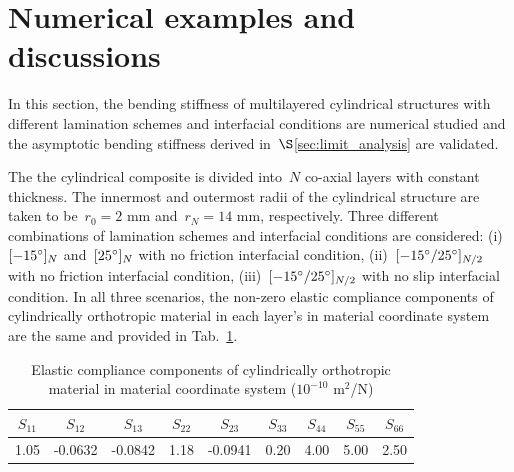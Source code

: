 \documentclass[preprint,10pt,times]{elsarticle}
\numberwithin{equation}{section}
\renewcommand{\>}{$\Rightarrow$}
\begin{document}
\section{Numerical examples and discussions}
\label{sec:discussion}
In this section, the bending stiffness of multilayered cylindrical structures with different lamination schemes and interfacial conditions are numerical studied and the asymptotic bending stiffness derived in~$\S$\ref{sec:limit_analysis} are validated.

The the cylindrical composite is divided into~$N$ co-axial layers with constant thickness.
The innermost and outermost radii of the cylindrical structure are taken to be~$r_0 = 2$ mm and~$r_N = 14$ mm, respectively.
Three different combinations of lamination schemes and interfacial conditions are considered: (i)~$[-15 \degree]_N$ and~$[25 \degree]_N$ with no friction interfacial condition, (ii)~$[-15 \degree/ 25 \degree]_{N/2}$ with no friction interfacial condition, (iii)~$[-15 \degree/25 \degree]_{N/2}$ with no slip interfacial condition. In all three scenarios, the non-zero elastic compliance components of cylindrically orthotropic material in each layer's in material coordinate system are the same and provided in Tab.~\ref{tab:sij}.
\begin{table}[h]
  \begin{center}
    \caption{Elastic compliance components of cylindrically orthotropic material in material coordinate system ($10^{-10}$ m$^2$/N) }
    \label{tab:sij}
    \begin{tabular}{|c|c|c|c|c|c|c|c|c|}\hline
      $S_{11}$ & $S_{12}$ & $S_{13}$ & $S_{22}$ & $S_{23}$ &
      $S_{33}$ & $S_{44}$ & $S_{55}$ & $S_{66}$  \\ \hline
      1.05 & -0.0632 & -0.0842 & 1.18 & -0.0941 &
      0.20 & 4.00 & 5.00 & 2.50  \\ \hline
    \end{tabular}
  \end{center}
\end{table}
\end{document}
